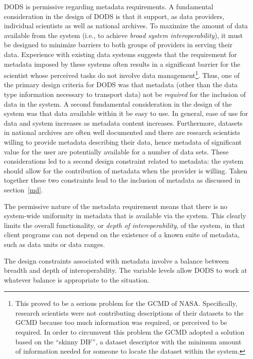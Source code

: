 \documentclass{article}
\begin{document}
\ac{DODS} is permissive regarding metadata requirements. A fundamental
consideration in the design of \ac{DODS} is that it support, as data
providers, individual scientists as well as national archives.  To maximize
the amount of data available from the system (i.e., to achieve \emph{broad
  system interoperability}), it must be designed to minimize barriers to both
groups of providers in serving their data. Experience with existing data
systems suggests that the requirement for metadata imposed by these systems
often results in a significant barrier for the scientist whose perceived
tasks do not involve data management\footnote{This proved to be a serious
  problem for the \ac{GCMD} of \acs{NASA}. Specifically, research scientists
  were not contributing descriptions of their datasets to the \ac{GCMD}
  because too much information was required, or perceived to be required. In
  order to circumvent this problem the \ac{GCMD} adopted a solution based on
  the ``skinny \acs{DIF}'', a dataset descriptor with the minimum amount of
  information needed for someone to locate the dataset within the system.}.
Thus, one of the primary design criteria for \ac{DODS} was that metadata
(other than the data type information necessary to transport data) not be
\emph{required} for the inclusion of data in the system. A second fundamental
consideration in the design of the system was that data available within it
be easy to use. In general, ease of use for data and system increases as
metadata content increases. Furthermore, datasets in national archives are
often well documented and there are research scientists willing to provide
metadata describing their data, hence metadata of significant value for the
user are potentially available for a number of data sets. These
considerations led to a second design constraint related to metadata: the
system should allow for the contribution of metadata when the provider is
willing. Taken together these two constraints lead to the inclusion of
metadata as discussed in section~\ref{md}.

The permissive nature of the metadata requirement means that there is no
system-wide uniformity in metadata that is available via the system. This
clearly limits the overall functionality, or \emph{depth of
  interoperability}, of the system, in that client programs can not depend on
the existence of a known suite of metadata, such as data units or data
ranges.

The design constraints associated with metadata involve a balance between
breadth and depth of interoperability. The variable levels allow \acs{DODS}
to work at whatever balance is appropriate to the situation.
\end{document}
